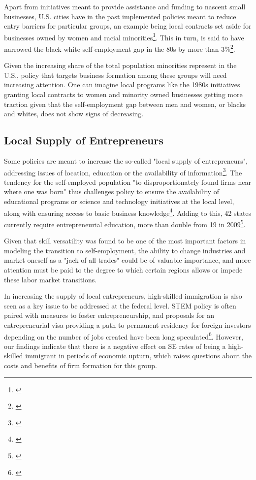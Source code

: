 Apart from initiatives meant to provide assistance and funding to nascent small businesses, U.S. cities have in the past implemented policies meant to reduce entry barriers for particular groups, an example being local contracts set aside for businesses owned by women and racial minorities\footnote{\cite{ChatterjiGlaeserKerr2014}}. This in turn, is said to have narrowed the black-white self-employment gap in the 80s by more than 3\%\footnote{\cite{ChatterjiGlaeserKerr2014}}.

Given the increasing share of the total population minorities represent in the U.S., policy that targets business formation among these groups will need increasing attention. One can imagine local programs like the 1980s initiatives granting local contracts to women and minority owned businesses getting more traction given that the self-employment gap between men and women, or blacks and whites, does not show signs of decreasing.  

\subsection{Local Supply of Entrepreneurs}

Some policies are meant to increase the so-called "local supply of entrepreneurs", addressing issues of location, education or the availability of information\footnote{\cite{ChatterjiGlaeserKerr2014}}. The tendency for the self-employed population "to disproportionately found firms near where one was born" thus challenges policy to ensure the availability of educational programs or science and technology initiatives at the local level, along with ensuring access to basic business knowledge\footnote{\cite{ChatterjiGlaeserKerr2014}}.  Adding to this, 42 states currently require entrepreneurial education, more than double from 19 in 2009\footnote{\cite{ChatterjiGlaeserKerr2014}}. 

Given that skill versatility was found to be one of the most important factors in modeling the transition to self-employment, the ability to change industries and market oneself as a "jack of all trades" could be of valuable importance, and more attention must be paid to the degree to which certain regions allows or impede these labor market transitions.

In increasing the supply of local entrepreneurs, high-skilled immigration is also seen as a key issue to be addressed at the federal level. STEM policy is often paired with measures to foster entrepreneurship, and proposals for an entrepreneurial visa providing a path to permanent residency for foreign investors depending on the number of jobs created have been long speculated\footnote{\cite{ChatterjiGlaeserKerr2014}}. However, our findings indicate that there is a negative effect on SE rates of being a high-skilled immigrant in periods of economic upturn, which raises questions about the costs and benefits of firm formation for this group.
















